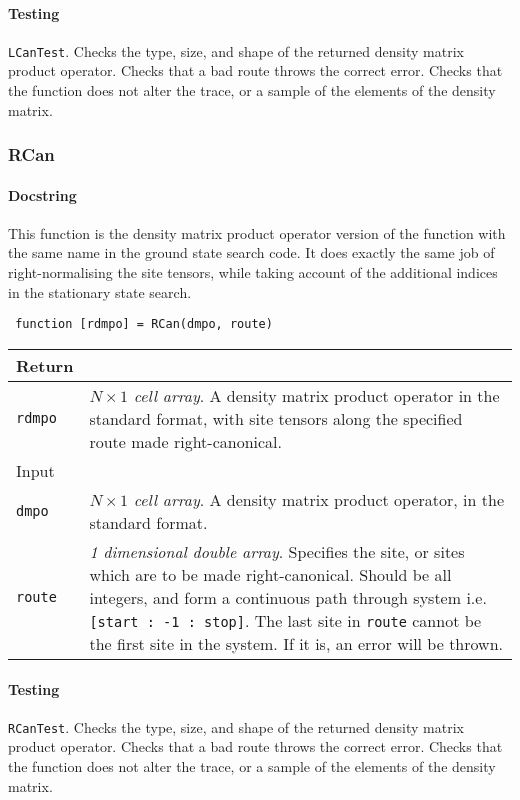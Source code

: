  \paragraph{Testing} \lstinline$LCanTest$. Checks the type, size, and shape of the returned density matrix product operator. Checks that a bad route throws the correct error. Checks that the function does not alter the trace, or a sample of the elements of the density matrix. 
 
 \subsubsection{RCan}
 \paragraph{Docstring} This function is the density matrix product operator version of the function with the same name in the ground state search code. It does exactly the same job of right-normalising the site tensors, while taking account of the additional indices in the stationary state search.
 \begin{lstlisting}
 function [rdmpo] = RCan(dmpo, route) \end{lstlisting}
  \begin{longtabu}{X[1,l]X[4,l]}
 \hline
 Return & \\ \hline
 \lstinline$rdmpo$ & \emph{\(N \times 1\) cell array}. A density matrix product operator in the standard format, with site tensors along the specified route made right-canonical. \\ \hline
 Input & \\
 \lstinline$dmpo$ & \emph{\(N \times 1\) cell array}. A density matrix product operator, in the standard format. \\
 \lstinline$route$ & \emph{1 dimensional double array}. Specifies the site, or sites which are to be made right-canonical. Should be all integers, and form a continuous path through system i.e. \lstinline$[start : -1 : stop]$. The last site in \lstinline$route$ cannot be the first site in the system. If it is, an error will be thrown. \\
 \hline
 \end{longtabu}
 \paragraph{Testing} \lstinline$RCanTest$.  Checks the type, size, and shape of the returned density matrix product operator. Checks that a bad route throws the correct error. Checks that the function does not alter the trace, or a sample of the elements of the density matrix. 
